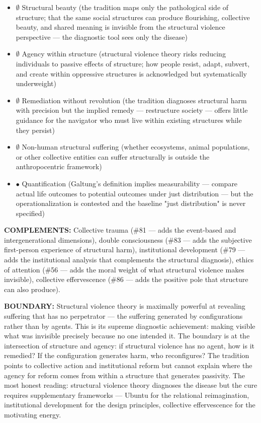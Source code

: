 \begin{itemize}[nosep,leftmargin=*]
  \item $\emptyset$ Structural beauty (the tradition maps only the pathological side of structure; that the same social structures can produce flourishing, collective beauty, and shared meaning is invisible from the structural violence perspective — the diagnostic tool sees only the disease)
  \item $\emptyset$ Agency within structure (structural violence theory risks reducing individuals to passive effects of structure; how people resist, adapt, subvert, and create within oppressive structures is acknowledged but systematically underweight)
  \item $\emptyset$ Remediation without revolution (the tradition diagnoses structural harm with precision but the implied remedy — restructure society — offers little guidance for the navigator who must live within existing structures while they persist)
  \item $\emptyset$ Non-human structural suffering (whether ecosystems, animal populations, or other collective entities can suffer structurally is outside the anthropocentric framework)
  \item $\bullet$ Quantification (Galtung's definition implies measurability — compare actual life outcomes to potential outcomes under just distribution — but the operationalization is contested and the baseline "just distribution" is never specified)
\end{itemize}


\textbf{COMPLEMENTS:} Collective trauma (\#81 — adds the event-based and intergenerational dimensions), double consciousness (\#83 — adds the subjective first-person experience of structural harm), institutional development (\#79 — adds the institutional analysis that complements the structural diagnosis), ethics of attention (\#56 — adds the moral weight of what structural violence makes invisible), collective effervescence (\#86 — adds the positive pole that structure can also produce).


\textbf{BOUNDARY:} Structural violence theory is maximally powerful at revealing suffering that has no perpetrator — the suffering generated by configurations rather than by agents. This is its supreme diagnostic achievement: making visible what was invisible precisely because no one intended it. The boundary is at the intersection of structure and agency: if structural violence has no agent, how is it remedied? If the configuration generates harm, who reconfigures? The tradition points to collective action and institutional reform but cannot explain where the agency for reform comes from within a structure that generates passivity. The most honest reading: structural violence theory diagnoses the disease but the cure requires supplementary frameworks — Ubuntu for the relational reimagination, institutional development for the design principles, collective effervescence for the motivating energy.


